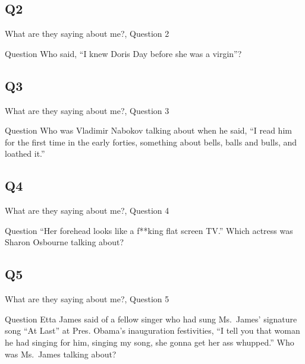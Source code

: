 \documentclass[11pt]{beamer}
\begin{document}
\subsection*{Q2}
\begin{frame}[t]{What are they saying about me?, Question 2}
\begin{block}{Question}
Who said, ``I knew Doris Day before she was a virgin''?
\end{block}
\end{frame}
\subsection*{Q3}
\begin{frame}[t]{What are they saying about me?, Question 3}
\begin{block}{Question}
Who was Vladimir Nabokov talking about when he said, ``I read him for the first time in the early forties, something about bells, balls and bulls, and loathed it.''
\end{block}
\end{frame}
\subsection*{Q4}
\begin{frame}[t]{What are they saying about me?, Question 4}
\begin{block}{Question}
``Her forehead looks like a f**king flat screen TV.'' Which actress was Sharon Osbourne talking about?
\end{block}
\end{frame}
\subsection*{Q5}
\begin{frame}[t]{What are they saying about me?, Question 5}
\begin{block}{Question}
Etta James said of a fellow singer who had sung Ms.\ James' signature song ``At Last'' at Pres. Obama's inauguration festivities, ``I tell you that woman he had singing for him, singing my song, she gonna get her ass whupped.'' Who was Ms.\ James talking about?  
\end{block}
\end{frame}
\end{document}
